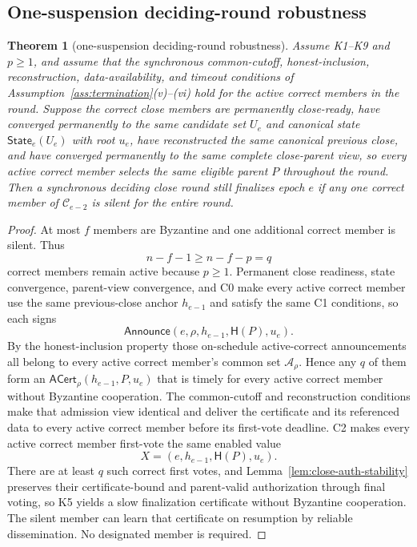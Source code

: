 \documentclass[11pt]{article}
\newtheorem{theorem}{Theorem}
\theoremstyle{definition}
\theoremstyle{remark}
\newcommand{\C}{\mathcal C}
\newcommand{\State}{\mathsf{State}}
\newcommand{\hash}{\mathsf{H}}
\newcommand{\Announce}{\mathsf{Announce}}
\newcommand{\ACert}{\mathsf{ACert}}
\begin{document}
\subsection{One-suspension deciding-round robustness}

\begin{theorem}[one-suspension deciding-round robustness]
\label{thm:one-suspension}
Assume K1--K9 and $p\ge1$, and assume that the synchronous common-cutoff, honest-inclusion, reconstruction, data-availability, and timeout conditions of Assumption~\ref{ass:termination}(v)--(vi) hold for the active correct members in the round. Suppose the correct close members are permanently close-ready, have converged permanently to the same candidate set $U_e$ and canonical state $\State_e(U_e)$ with root $u_e$, have reconstructed the same canonical previous close, and have converged permanently to the same complete close-parent view, so every active correct member selects the same eligible parent $P$ throughout the round. Then a synchronous deciding close round still finalizes epoch $e$ if any one correct member of $\C_{e-2}$ is silent for the entire round.
\end{theorem}

\begin{proof}
At most $f$ members are Byzantine and one additional correct member is silent. Thus
\[
  n-f-1\ge n-f-p=q
\]
correct members remain active because $p\ge1$. Permanent close readiness, state convergence, parent-view convergence, and C0 make every active correct member use the same previous-close anchor $h_{e-1}$ and satisfy the same C1 conditions, so each signs
\[
  \Announce(e,\rho,h_{e-1},\hash(P),u_e).
\]
By the honest-inclusion property those on-schedule active-correct announcements all belong to every active correct member's common set $\mathcal A_\rho$. Hence any $q$ of them form an $\ACert_\rho(h_{e-1},P,u_e)$ that is timely for every active correct member without Byzantine cooperation. The common-cutoff and reconstruction conditions make that admission view identical and deliver the certificate and its referenced data to every active correct member before its first-vote deadline. C2 makes every active correct member first-vote the same enabled value
\[
  X=(e,h_{e-1},\hash(P),u_e).
\]
There are at least $q$ such correct first votes, and Lemma~\ref{lem:close-auth-stability} preserves their certificate-bound and parent-valid authorization through final voting, so K5 yields a slow finalization certificate without Byzantine cooperation. The silent member can learn that certificate on resumption by reliable dissemination. No designated member is required.
\end{proof}
\end{document}
